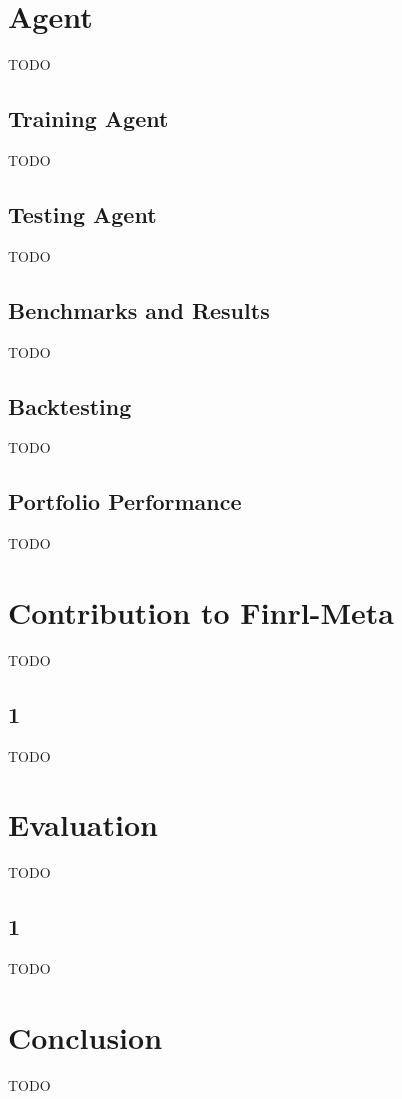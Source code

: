 \chapter{Agent}\label{ch:agent}
TODO


\section{Training Agent}\label{sec:training-agent}
TODO


\section{Testing Agent}\label{sec:testing-agent}
TODO


\section{Benchmarks and Results}\label{sec:benchmarks-and-results}
TODO


\section{Backtesting}\label{sec:backtesting}
TODO


\section{Portfolio Performance}\label{sec:portfolio-performance}
TODO




\chapter{Contribution to Finrl-Meta}\label{ch:contribution-to-finrl-meta}
TODO


\section{1}\label{sec:1}
TODO



\chapter{Evaluation}\label{ch:evaluation}
TODO


\section{1}\label{sec:12}
TODO



\chapter{Conclusion}\label{ch:conclusion}
TODO

\fi
